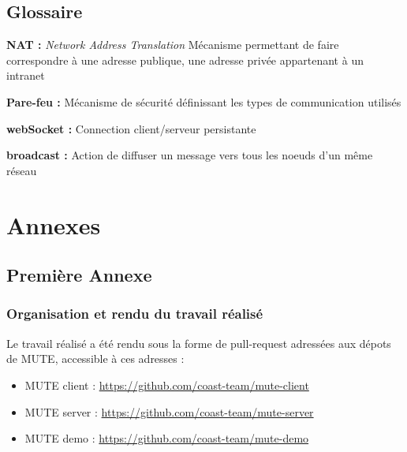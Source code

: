 \documentclass{tnreport}
\begin{document}
\cleardoublepage

\renewcommand{\tocbibname}{Bibliographie / Webographie}

\nocite{*}


\cleardoublepage

\listoffigures
\cleardoublepage


\chapter*{Glossaire}
\textbf{NAT : }\emph{Network Address Translation} Mécanisme permettant de faire correspondre à une adresse publique, une adresse privée appartenant à un intranet 

\textbf{Pare-feu :} Mécanisme de sécurité définissant les types de communication utilisés

\textbf{webSocket :} Connection client/serveur persistante

\textbf{broadcast :} Action de diffuser un message vers tous les noeuds d'un même réseau


\cleardoublepage
\renewcommand{\thesubsection}{\Roman{subsection}}

\appendix
\part*{Annexes}
\cleardoublepage

\chapter{Première Annexe}
\section{Organisation et rendu du travail réalisé}
\label{sec:orga}

Le travail réalisé a été rendu sous la forme de pull-request adressées aux dépots de MUTE, accessible à ces adresses :
\begin{itemize}
  \item MUTE client : \url{https://github.com/coast-team/mute-client}
  \item MUTE server : \url{https://github.com/coast-team/mute-server}
  \item MUTE demo : \url{https://github.com/coast-team/mute-demo}\\
\end{itemize}
\end{document}
